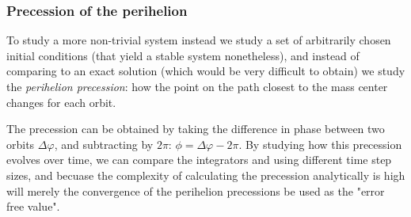 \subsubsection{Precession of the perihelion}

To study a more non-trivial system instead we study a set of arbitrarily chosen initial conditions (that yield a stable system nonetheless), and instead of comparing to an exact solution (which would be very difficult to obtain) we study the \textit{perihelion precession}: how the point on the path closest to the mass center changes for each orbit. 

The precession can be obtained by taking the difference in phase between two orbits $\Delta \varphi$, and subtracting by $2\pi$: $\phi = \Delta \varphi - 2\pi$. By studying how this precession evolves over time, we can compare the integrators and using different time step sizes, and becuase the complexity of calculating the precession analytically is high will merely the convergence of the perihelion precessions be used as the "error free value". 



